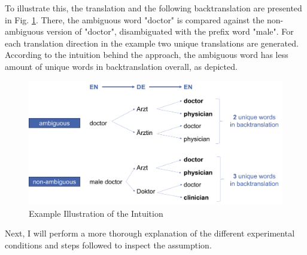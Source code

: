 To illustrate this, the translation and the following backtranslation are presented in Fig. \ref{fig:intuition}. There, the ambiguous word "doctor" is compared against the non-ambiguous version of "doctor", disambiguated with the prefix word "male". For each translation direction in the example two unique translations are generated. According to the intuition behind the approach, the ambiguous word has less amount of unique words in backtranslation overall, as depicted.

\begin{figure}
  \centering
  \includegraphics[scale=0.45]{figures/intuition.png}
  \caption{Example Illustration of the Intuition}
  \label{fig:intuition}
\end{figure}

Next, I will perform a more thorough explanation of the different experimental conditions and steps followed to inspect the assumption.



